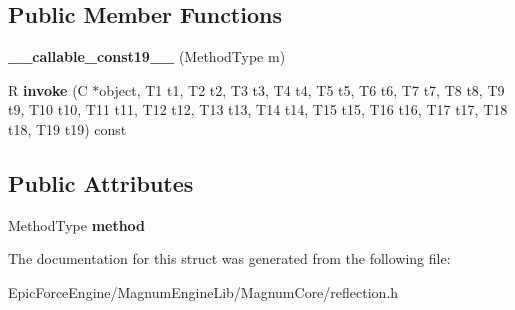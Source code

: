 \subsection*{Public Member Functions}
\begin{DoxyCompactItemize}
\item 
{\bfseries \+\_\+\+\_\+callable\+\_\+const19\+\_\+\+\_\+} (Method\+Type m)\hypertarget{structagm_1_1reflection_1_1____callable__const19_____aa05b43c0e91685ae71733b5d4d84acca}{}\label{structagm_1_1reflection_1_1____callable__const19_____aa05b43c0e91685ae71733b5d4d84acca}

\item 
R {\bfseries invoke} (C $\ast$object, T1 t1, T2 t2, T3 t3, T4 t4, T5 t5, T6 t6, T7 t7, T8 t8, T9 t9, T10 t10, T11 t11, T12 t12, T13 t13, T14 t14, T15 t15, T16 t16, T17 t17, T18 t18, T19 t19) const \hypertarget{structagm_1_1reflection_1_1____callable__const19_____acb2d162b3f13ac3f2b8eb910f2cb957c}{}\label{structagm_1_1reflection_1_1____callable__const19_____acb2d162b3f13ac3f2b8eb910f2cb957c}

\end{DoxyCompactItemize}
\subsection*{Public Attributes}
\begin{DoxyCompactItemize}
\item 
Method\+Type {\bfseries method}\hypertarget{structagm_1_1reflection_1_1____callable__const19_____a665c4cb43a9d9025f083eca679c4982b}{}\label{structagm_1_1reflection_1_1____callable__const19_____a665c4cb43a9d9025f083eca679c4982b}

\end{DoxyCompactItemize}


The documentation for this struct was generated from the following file\+:\begin{DoxyCompactItemize}
\item 
Epic\+Force\+Engine/\+Magnum\+Engine\+Lib/\+Magnum\+Core/reflection.\+h\end{DoxyCompactItemize}
